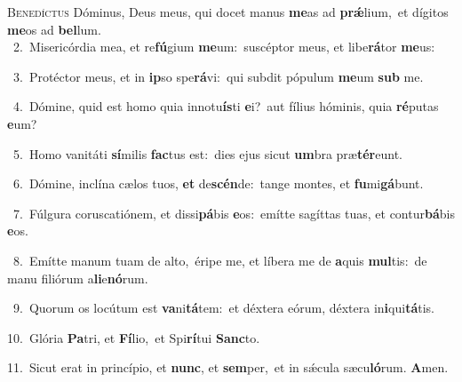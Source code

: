 \lettrine{\initial\textcolor{\initialcolor}{B}}{enedíctus} Dóminus, Deus meus, qui docet manus \textbf{me}\-as ad \textbf{prǽ}\-lium,~\star et dígitos \textbf{me}\-os ad \textbf{bel}\-lum.\\
{\numbfont\textcolor{\numbcolor}{~2.}}~Misericórdia mea, et re\-\textbf{fú}\-gium \textbf{me}\-um:~\star suscéptor meus, et libe\-\textbf{rá}\-tor \textbf{me}\-us:\par
{\numbfont\textcolor{\numbcolor}{~3.}}~Protéctor meus, et in \textbf{ip}\-so spe\-\textbf{rá}\-vi:~\star qui subdit pópulum \textbf{me}\-um \textbf{sub} me.\par
{\numbfont\textcolor{\numbcolor}{~4.}}~Dómine, quid est homo quia innotu\-\textbf{ís}\-ti \textbf{e}\-i?~\star aut fílius hóminis, quia \textbf{ré}\-putas \textbf{e}\-um?\par
{\numbfont\textcolor{\numbcolor}{~5.}}~Homo vanitáti \textbf{sí}\-milis \textbf{fac}\-tus est:~\star dies ejus sicut \textbf{um}\-bra præ\-\textbf{tér}\-eunt.\par
{\numbfont\textcolor{\numbcolor}{~6.}}~Dómine, inclína cælos tuos, \textbf{et} de\-\textbf{scén}\-de:~\star tange montes, et \textbf{fu}\-mi\-\textbf{gá}\-bunt.\par
{\numbfont\textcolor{\numbcolor}{~7.}}~Fúlgura coruscatiónem, et dissi\-\textbf{pá}\-bis \textbf{e}\-os:~\star emítte sagíttas tuas, et contur\-\textbf{bá}\-bis \textbf{e}\-os.\par
{\numbfont\textcolor{\numbcolor}{~8.}}~Emítte manum tuam de alto,~\dagger éripe me, et líbera me de \textbf{a}\-quis \textbf{mul}\-tis:~\star de manu filiórum a\-\textbf{li}\-e\-\textbf{nó}\-rum.\par
{\numbfont\textcolor{\numbcolor}{~9.}}~Quorum os locútum est \textbf{va}\-ni\-\textbf{tá}\-tem:~\star et déxtera eórum, déxtera in\-\textbf{i}\-qui\-\textbf{tá}\-tis.\par
{\numbfont\textcolor{\numbcolor}{10.}}~Glória \textbf{Pa}\-tri, et \textbf{Fí}\-lio,~\star et Spi\-\textbf{rí}\-tui \textbf{Sanc}\-to.\par
{\numbfont\textcolor{\numbcolor}{11.}}~Sicut erat in princípio, et \textbf{nunc}\-, et \textbf{sem}\-per,~\star et in sǽcula sæcu\-\textbf{ló}\-rum. \textbf{A}\-men.\par
